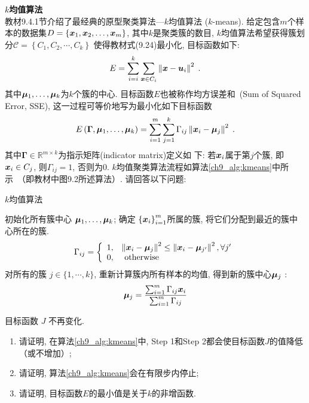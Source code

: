 \documentclass[answers]{exam}  %
\begin{document}
\begin{questions}
  \question [20] \textbf{$k$均值算法} \\
  \label{ch9_prob:kmeans}
  教材9.4.1节介绍了最经典的原型聚类算法---$k$均值算法 ($k$-means). 给定包含$m$个样本的数据集$D =\left\{{\boldsymbol{x}}_{1}, {\boldsymbol{x}}_{2}, \ldots, {\boldsymbol{x}}_{m}\right\}$, 其中$k$是聚类簇的数目, $k$均值算法希望获得簇划分$\mathcal{C}=\left\{C_{1}, C_{2}, \cdots, C_{k}\right\}$
  使得教材式(9.24)最小化, 目标函数如下:
  \begin{equation}
    E=\sum_{i=i}^{k}\sum_{{\boldsymbol{x}} \in C_{i}}\left\| {\boldsymbol{x}}-\boldsymbol{u}_{i} \right\|^{2}\;.
  \end{equation}
  其中$\boldsymbol{\mu}_{1}, \ldots, \boldsymbol{\mu}_{k}$为$k$个簇的中心. 目标函数$E$也被称作均方误差和~(Sum of Squared Error, SSE),
  这一过程可等价地写为最小化如下目标函数
  \begin{equation} \label{ch9_kmeans_obj}
    E\left(\mathbf{\Gamma}, \boldsymbol{\mu}_{1}, \ldots, \boldsymbol{\mu}_{k}\right)=\sum_{i=1}^{m} \sum_{j=1}^{k} {\Gamma}_{i j}\left\|{\boldsymbol{x}}_{i}-\boldsymbol{\mu}_{j}\right\|^{2}\;.
  \end{equation}
  其中$\mathbf{\Gamma} \in \mathbb{R}^{m \times k}$为指示矩阵(indicator matrix)定义如
  下: 若${\boldsymbol{x}}_{i}$属于第$j$个簇, 即${\boldsymbol{x}}_i\in C_j$, 则${\Gamma}_{i j}=1$, 否则为0.
  $k$均值聚类算法流程如算法\ref{ch9_alg:kmeans}中所示~（即教材中图9.2所述算法）. 请回答以下问题:
  {\begin{algorithm}[ht]
    \caption{ $k$均值算法 }
    \label{ch9_alg:kmeans}
    \begin{algorithmic}[1]{
        \State 初始化所有簇中心 $\boldsymbol{\mu}_{1}, \ldots, \boldsymbol{\mu}_{k}$;
        \Repeat
         确定 $\left\{{\boldsymbol{x}}_{i}\right\}_{i=1}^{m}$所属的簇, 将它们分配到最近的簇中心所在的簇.
        \begin{align}{\Gamma}_{i j}=\left\{\begin{array}{ll}
            1, & \left\|{\boldsymbol{x}}_{i}-\boldsymbol{\mu}_{j}\right\|^{2} \leq \left\|{\boldsymbol{x}}_{i}-\boldsymbol{\mu}_{j^{\prime}}\right\|^{2}, \forall j^{\prime} \\
            0, & \text { otherwise }
          \end{array}\right.\end{align} \label{ch9_:step1}
         对所有的簇 $j \in\{1, \cdots, k\}$, 重新计算簇内所有样本的均值, 得到新的簇中心$\boldsymbol{\mu}_j$  :
        \begin{align}\boldsymbol{\mu}_{j}=\frac{\sum_{i=1}^{m} {\Gamma}_{i j} {\boldsymbol{x}}_{i}}{\sum_{i=1}^{m} {\Gamma}_{i j}}\end{align}

        \Until 目标函数 $J$ 不再变化.}
    \end{algorithmic}
  \end{algorithm}}
  \begin{enumerate}
    \item 请证明, 在算法\ref{ch9_alg:kmeans}中, Step 1和Step 2都会使目标函数$J$的值降低（或不增加）;
    \item 请证明, 算法\ref{ch9_alg:kmeans}会在有限步内停止;
    \item 请证明, 目标函数$E$的最小值是关于$k$的非增函数.
  \end{enumerate}



\end{questions}
\end{document}

